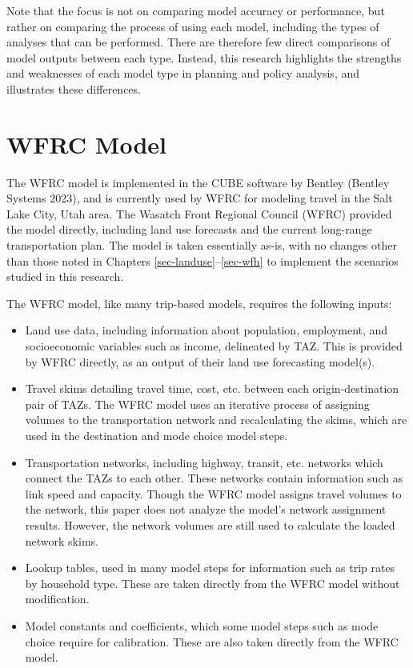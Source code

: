 \documentclass[fancy, twoside, mastersfancy, ms]{byuthesis}
\providecommand{\tightlist}{%
  \setlength{\itemsep}{0pt}\setlength{\parskip}{0pt}}\usepackage{longtable,booktabs,array}
\begin{document}
Note that the focus is not on comparing model accuracy or performance,
but rather on comparing the process of using each model, including the
types of analyses that can be performed. There are therefore few direct
comparisons of model outputs between each type. Instead, this research
highlights the strengths and weaknesses of each model type in planning
and policy analysis, and illustrates these differences.

\section{WFRC Model}\label{wfrc-model}

The WFRC model is implemented in the CUBE software by Bentley (Bentley
Systems 2023), and is currently used by WFRC for modeling travel in the
Salt Lake City, Utah area. The Wasatch Front Regional Council (WFRC)
provided the model directly, including land use forecasts and the
current long-range transportation plan. The model is taken essentially
as-is, with no changes other than those noted in Chapters
\ref{sec-landuse}--\ref{sec-wfh} to implement the scenarios studied in
this research.

The WFRC model, like many trip-based models, requires the following
inputs:

\begin{itemize}
\tightlist
\item
  Land use data, including information about population, employment, and
  socioeconomic variables such as income, delineated by TAZ. This is
  provided by WFRC directly, as an output of their land use forecasting
  model(s).
\item
  Travel skims detailing travel time, cost, etc. between each
  origin-destination pair of TAZs. The WFRC model uses an iterative
  process of assigning volumes to the transportation network and
  recalculating the skims, which are used in the destination and mode
  choice model steps.
\item
  Transportation networks, including highway, transit, etc. networks
  which connect the TAZs to each other. These networks contain
  information such as link speed and capacity. Though the WFRC model
  assigns travel volumes to the network, this paper does not analyze the
  model's network assignment results. However, the network volumes are
  still used to calculate the loaded network skims.
\item
  Lookup tables, used in many model steps for information such as trip
  rates by household type. These are taken directly from the WFRC model
  without modification.
\item
  Model constants and coefficients, which some model steps such as mode
  choice require for calibration. These are also taken directly from the
  WFRC model.
\end{itemize}
\end{document}
